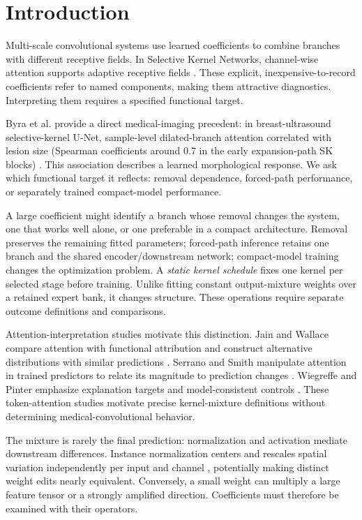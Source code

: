 \documentclass[mathematics,article,submit,pdftex,moreauthors]{Definitions/mdpi}
\begin{document}


\section{Introduction}
Multi-scale convolutional systems use learned coefficients to combine
branches with different receptive fields. In Selective Kernel Networks,
channel-wise attention supports adaptive receptive fields \cite{li2019sknet}.
These explicit, inexpensive-to-record coefficients refer to named components,
making them attractive diagnostics. Interpreting them requires a specified
functional target.

Byra et al. provide a direct medical-imaging precedent: in breast-ultrasound
selective-kernel U-Net, sample-level dilated-branch attention correlated with
lesion size (Spearman coefficients around 0.7 in the early expansion-path
SK blocks) \cite{byra2020skunet}.
This association describes a learned morphological response. We ask which
functional target it reflects: removal dependence, forced-path performance,
or separately trained compact-model performance.

A large coefficient might identify a branch whose removal changes the
system, one that works well alone, or one preferable in a compact architecture.
Removal preserves the remaining fitted parameters; forced-path inference
retains one branch and the shared encoder/downstream network; compact-model
training changes the optimization problem. A \emph{static kernel schedule}
fixes one kernel per selected stage before training. Unlike fitting constant
output-mixture weights over a retained expert bank, it changes structure.
These operations require separate outcome definitions and comparisons.

Attention-interpretation studies motivate this distinction. Jain and Wallace
compare attention with functional attribution and construct alternative
distributions with similar predictions
\cite{jain2019attention}. Serrano and Smith manipulate attention in trained
predictors to relate its magnitude to prediction changes \cite{serrano2019attention}.
Wiegreffe and Pinter emphasize explanation targets and model-consistent
controls \cite{wiegreffe2019attention}. These token-attention studies motivate
precise kernel-mixture definitions without determining medical-convolutional
behavior.

The mixture is rarely the final prediction: normalization and activation
mediate downstream differences. Instance normalization centers and rescales
spatial variation independently per input and channel \cite{ulyanov2016instance},
potentially making distinct weight edits nearly equivalent. Conversely, a
small weight can multiply a large feature tensor or a strongly amplified
direction. Coefficients must therefore be examined with their operators.
\end{document}
